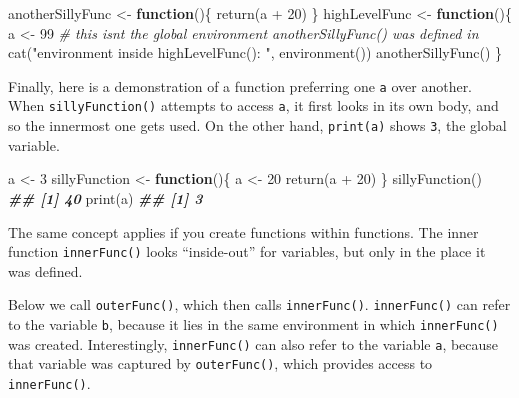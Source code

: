 \documentclass[
  12pt,
  krantz2]{krantz}
\makeatletter
\newenvironment{Shaded}{\begin{snugshade}}{\end{snugshade}}
\newcommand{\CommentTok}[1]{\textcolor[rgb]{0.37,0.37,0.37}{\textit{#1}}}
\newcommand{\ControlFlowTok}[1]{\textcolor[rgb]{0.27,0.27,0.27}{\textbf{#1}}}
\newcommand{\DecValTok}[1]{\textcolor[rgb]{0.06,0.06,0.06}{#1}}
\newcommand{\DocumentationTok}[1]{\textcolor[rgb]{0.37,0.37,0.37}{\textbf{\textit{#1}}}}
\newcommand{\FunctionTok}[1]{\textcolor[rgb]{0,0,0}{#1}}
\newcommand{\NormalTok}[1]{#1}
\newcommand{\OtherTok}[1]{\textcolor[rgb]{0.37,0.37,0.37}{#1}}
\newcommand{\SpecialCharTok}[1]{\textcolor[rgb]{0,0,0}{#1}}
\newcommand{\StringTok}[1]{\textcolor[rgb]{0.5,0.5,0.5}{#1}}
\newenvironment{kframe}{%
\medskip{}
\setlength{\fboxsep}{.8em}
 \def\at@end@of@kframe{}%
 \ifinner\ifhmode%
  \def\at@end@of@kframe{\end{minipage}}%
  \begin{minipage}{\columnwidth}%
 \fi\fi%
 \def\FrameCommand##1{\hskip\@totalleftmargin \hskip-\fboxsep
 \colorbox{shadecolor}{##1}\hskip-\fboxsep
     \hskip-\linewidth \hskip-\@totalleftmargin \hskip\columnwidth}%
 \MakeFramed {\advance\hsize-\width
   \@totalleftmargin\z@ \linewidth\hsize
   \@setminipage}}%
 {\par\unskip\endMakeFramed%
 \at@end@of@kframe}
\renewenvironment{Shaded}{\begin{kframe}}{\end{kframe}}
\makeatother
\begin{document}
\begin{Shaded}
\begin{Highlighting}[]
\NormalTok{anotherSillyFunc }\OtherTok{\textless{}{-}} \ControlFlowTok{function}\NormalTok{()\{}
  \FunctionTok{return}\NormalTok{(a }\SpecialCharTok{+} \DecValTok{20}\NormalTok{) }
\NormalTok{\}}
\NormalTok{highLevelFunc }\OtherTok{\textless{}{-}} \ControlFlowTok{function}\NormalTok{()\{}
\NormalTok{  a }\OtherTok{\textless{}{-}} \DecValTok{99}
  \CommentTok{\# this isn\textquotesingle{}t the global environment anotherSillyFunc() was defined in}
  \FunctionTok{cat}\NormalTok{(}\StringTok{"environment inside highLevelFunc(): "}\NormalTok{, }\FunctionTok{environment}\NormalTok{())}
  \FunctionTok{anotherSillyFunc}\NormalTok{()}
\NormalTok{\}}
\end{Highlighting}
\end{Shaded}

Finally, here is a demonstration of a function preferring one \texttt{a} over another. When \texttt{sillyFunction()} attempts to access \texttt{a}, it first looks in its own body, and so the innermost one gets used. On the other hand, \texttt{print(a)} shows \texttt{3}, the global variable.

\begin{Shaded}
\begin{Highlighting}[]
\NormalTok{a }\OtherTok{\textless{}{-}} \DecValTok{3}
\NormalTok{sillyFunction }\OtherTok{\textless{}{-}} \ControlFlowTok{function}\NormalTok{()\{}
\NormalTok{  a }\OtherTok{\textless{}{-}} \DecValTok{20}
  \FunctionTok{return}\NormalTok{(a }\SpecialCharTok{+} \DecValTok{20}\NormalTok{) }
\NormalTok{\}}
\FunctionTok{sillyFunction}\NormalTok{()}
\DocumentationTok{\#\# [1] 40}
\FunctionTok{print}\NormalTok{(a)}
\DocumentationTok{\#\# [1] 3}
\end{Highlighting}
\end{Shaded}

The same concept applies if you create functions within functions. The inner function \texttt{innerFunc()} looks ``inside-out'' for variables, but only in the place it was defined.

Below we call \texttt{outerFunc()}, which then calls \texttt{innerFunc()}. \texttt{innerFunc()} can refer to the variable \texttt{b}, because it lies in the same environment in which \texttt{innerFunc()} was created. Interestingly, \texttt{innerFunc()} can also refer to the variable \texttt{a}, because that variable was captured by \texttt{outerFunc()}, which provides access to \texttt{innerFunc()}.
\end{document}
